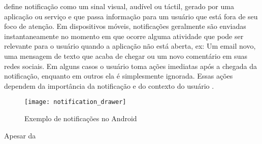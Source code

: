 \cite{iqbal2010notifications} define notificação como um sinal visual, audível ou táctil, gerado por uma aplicação
ou serviço e que passa informação para um usuário que está fora de seu foco de atenção. Em dispositivos móveis,
notificações geralmente são enviadas instantaneamente no momento em que ocorre alguma atividade que pode ser relevante
para o usuário quando a aplicação não está aberta, ex: Um email novo, uma mensagem de texto que acaba de chegar ou um
novo comentário em suas redes sociais. Em alguns casos o usuário toma ações imediatas após a chegada da notificação,
enquanto em outros ela é simplesmente ignorada. Essas ações dependem da importância da notificação e do contexto do
usuário \cite{sahami2014large}.

\begin{figure}[h]
\centering
\texttt{[image: notification\_drawer]}
\caption{Exemplo de notificações no Android \cite{notificationDrawer}}
\label{notification-drawer}
\end{figure}

Apesar da
